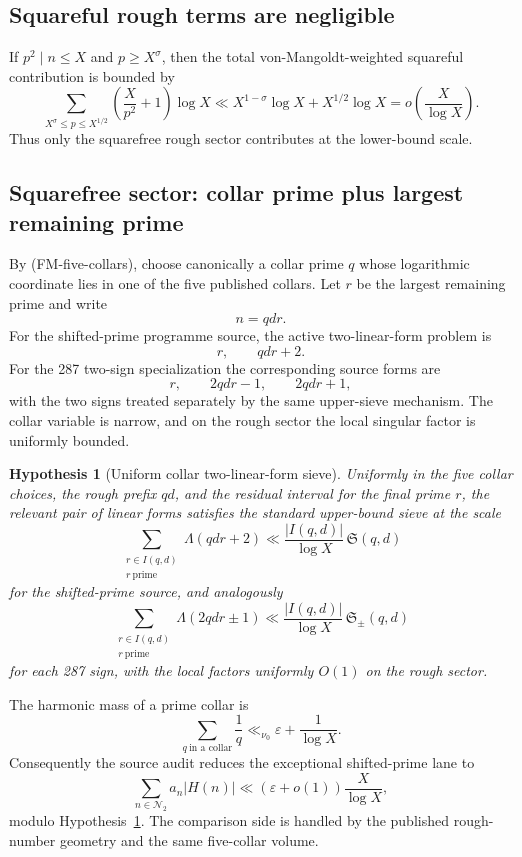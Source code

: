 \documentclass[11pt]{article}
\newtheorem{hypothesis}[theorem]{Hypothesis}
\theoremstyle{definition}
\theoremstyle{remark}
\newcommand{\1}{\mathbf 1}
\begin{document}
\subsection{Squareful rough terms are negligible}

If $p^2\mid n\le X$ and $p\ge X^\sigma$, then the total von-Mangoldt-weighted squareful contribution is bounded by
\[
 \sum_{X^\sigma\le p\le X^{1/2}}
 \left(\frac{X}{p^2}+1\right)\log X
 \ll X^{1-\sigma}\log X+X^{1/2}\log X
 =o\!\left(\frac{X}{\log X}\right).
\tag{N2-squareful}
\]
Thus only the squarefree rough sector contributes at the lower-bound scale.

\subsection{Squarefree sector: collar prime plus largest remaining prime}

By (FM-five-collars), choose canonically a collar prime $q$ whose logarithmic coordinate lies in one of the five
published collars.  Let $r$ be the largest remaining prime and write
\[
 \boxed{n=qdr.}
\tag{N2-qdr}
\]
For the shifted-prime programme source, the active two-linear-form problem is
\[
 \boxed{r,\qquad qdr+2.}
\tag{N2-twin-forms}
\]
For the 287 two-sign specialization the corresponding source forms are
\[
 \boxed{r,\qquad 2qdr-1,\qquad 2qdr+1,}
\tag{N2-287-forms}
\]
with the two signs treated separately by the same upper-sieve mechanism.  The collar variable is narrow, and on
the rough sector the local singular factor is uniformly bounded.

\begin{hypothesis}[Uniform collar two-linear-form sieve]\label{hyp:N2cell}
Uniformly in the five collar choices, the rough prefix $qd$, and the residual interval for the final prime $r$,
the relevant pair of linear forms satisfies the standard upper-bound sieve at the scale
\[
 \sum_{\substack{r\in I(q,d)\\ r\ \mathrm{prime}}}
 \Lambda(qdr+2)
 \ll \frac{|I(q,d)|}{\log X}\,\mathfrak S(q,d)
\tag{N2-twin-sieve}
\]
for the shifted-prime source, and analogously
\[
 \sum_{\substack{r\in I(q,d)\\ r\ \mathrm{prime}}}
 \Lambda(2qdr\pm1)
 \ll \frac{|I(q,d)|}{\log X}\,\mathfrak S_\pm(q,d)
\tag{N2-287-sieve}
\]
for each 287 sign, with the local factors uniformly $O(1)$ on the rough sector.
\end{hypothesis}

The harmonic mass of a prime collar is
\[
 \sum_{q\ \text{in a collar}}\frac1q
 \ll_{\nu_0}\varepsilon+\frac1{\log X}.
\tag{N2-collar-mass}
\]
Consequently the source audit reduces the exceptional shifted-prime lane to
\[
 \boxed{
 \sum_{n\in\mathcal N_2}a_n|H(n)|
 \ll \left(\varepsilon+o(1)\right)\frac{X}{\log X},}
\tag{N2-shifted-bound}
\]
modulo Hypothesis~\ref{hyp:N2cell}.  The comparison side is handled by the published rough-number geometry and
the same five-collar volume.
\end{document}
